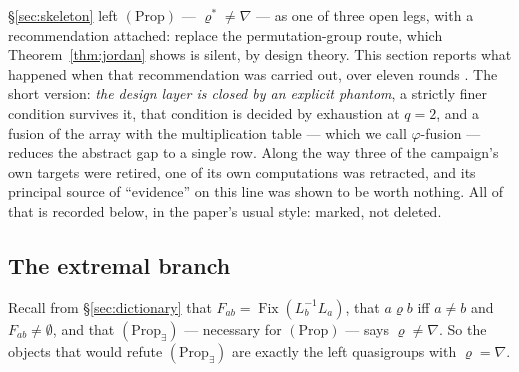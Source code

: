\documentclass[11pt]{article}
\theoremstyle{plain}
\theoremstyle{definition}
\theoremstyle{remark}
\numberwithin{equation}{section}
\newcommand{\Fix}{\operatorname{Fix}}
\begin{document}
\S\ref{sec:skeleton} left $(\mathrm{Prop})$ --- $\varrho^{*}\ne\nabla$ --- as one
of three open legs, with a recommendation attached: replace the
permutation-group route, which Theorem~\ref{thm:jordan} shows is silent, by
design theory. This section reports what happened when that recommendation was
carried out, over eleven rounds \cite{R9C,R9D,R9E,R9F,R9G,R9H,R9I,R9J,R9K,R9L,R10A}.
The short version: \emph{the design layer is closed by an explicit phantom}, a
strictly finer condition survives it, that condition is decided by exhaustion at
$q=2$, and a fusion of the array with the multiplication table --- which we call
$\varphi$-fusion --- reduces the abstract gap to a single row. Along the way three
of the campaign's own targets were retired, one of its own computations was
retracted, and its principal source of ``evidence'' on this line was shown to be
worth nothing. All of that is recorded below, in the paper's usual style: marked,
not deleted.

\begin{center}
\end{center}

\subsection{The extremal branch}\label{sec:branch}

Recall from \S\ref{sec:dictionary} that $F_{ab} = \Fix(L_b^{-1}L_a)$, that
$a\mathrel\varrho b$ iff $a\ne b$ and $F_{ab}\ne\emptyset$, and that
$(\mathrm{Prop}_{\exists})$ --- necessary for $(\mathrm{Prop})$ --- says
$\varrho\ne\nabla$. So the objects that would refute $(\mathrm{Prop}_{\exists})$
are exactly the left quasigroups with $\varrho = \nabla$.
\end{document}
